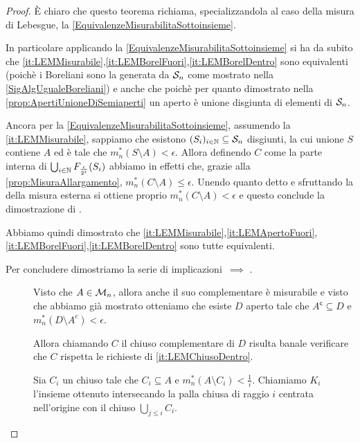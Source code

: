 \begin{proof}
	È chiaro che questo teorema richiama, specializzandola al caso della misura di Lebesgue, la \cref{EquivalenzeMisurabilitaSottoinsieme}.
	
	In particolare applicando la \cref{EquivalenzeMisurabilitaSottoinsieme} si ha da subito che \ref{it:LEMMisurabile},\ref{it:LEMBorelFuori},\ref{it:LEMBorelDentro} sono equivalenti (poichè i Boreliani sono la \sigalg{} generata da $\S_n$ come mostrato nella \cref{SigAlgUgualeBoreliani}) e anche che  poichè per quanto dimostrato nella \cref{prop:ApertiUnioneDiSemiaperti} un aperto è unione disgiunta di elementi di $\S_n$.
	
	Ancora per la \cref{EquivalenzeMisurabilitaSottoinsieme}, assumendo la \ref{it:LEMMisurabile}, sappiamo che esistono $(S_i)_{i\in\N}\subseteq \S_n$ disgiunti, la cui unione $S$ contiene $A$ ed è tale che $m_n^*(S\setminus A)<\epsilon$.
	Allora definendo $C$ come la parte interna di $\bigcup_{i\in\N}F_\frac{\epsilon}{2^i}(S_i)$ abbiamo in effetti che, grazie alla \cref{prop:MisuraAllargamento}, $m_n^*(C\setminus A)\le \epsilon$.
	Unendo quanto detto e sfruttando la \sigsubadd[ità] della misura esterna si ottiene proprio $m_n^*(C\setminus A)<\epsilon$ e questo conclude la dimostrazione di .
	
	Abbiamo quindi dimostrato che \ref{it:LEMMisurabile},\ref{it:LEMApertoFuori},\ref{it:LEMBorelFuori},\ref{it:LEMBorelDentro} sono tutte equivalenti.
	
	Per concludere dimostriamo la serie di implicazioni $\,\implies\,\,$.
	\begin{description}
		\item[] Visto che $A\in\M_n$, allora anche il suo complementare è misurabile e visto che abbiamo già mostrato  otteniamo che esiste $D$ aperto tale che $A^\mathsf{c}\subseteq D$ e $m_n^*(D\setminus A^c)< \epsilon$.
		
		Allora chiamando $C$ il chiuso complementare di $D$ risulta banale verificare che $C$ rispetta le richieste di \ref{it:LEMChiusoDentro}.
		\item[] Sia $C_i$ un chiuso tale che $C_i\subseteq A$ e $m_n^*(A\setminus C_i)<\frac1i$.
		Chiamiamo $K_i$ l'insieme ottenuto intersecando la palla chiusa di raggio $i$ centrata nell'origine con il chiuso $\bigcup_{j\le i}C_i$.
		

\end{description}
\end{proof}
